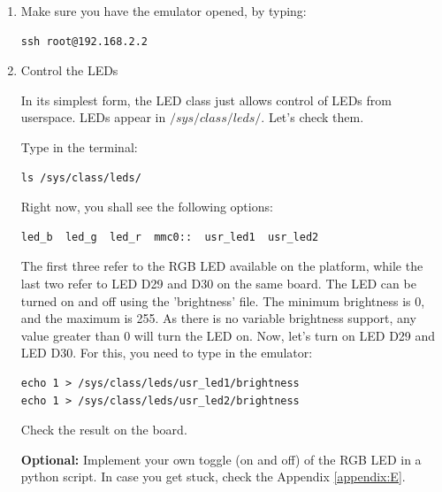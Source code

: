 \begin{enumerate}
\item Make sure you have the emulator opened, by typing:

   \begin{tcolorbox}
        \begin{verbatim}
ssh root@192.168.2.2
        \end{verbatim}
    \end{tcolorbox}


\item Control the LEDs

In its simplest form, the LED class just allows control of LEDs from userspace. LEDs appear in $/sys/class/leds/$. Let's check them.

Type in the terminal:
   \begin{tcolorbox}
        \begin{verbatim}
ls /sys/class/leds/
        \end{verbatim}
    \end{tcolorbox}

Right now, you shall see the following options:

   \begin{tcolorbox}
        \begin{verbatim}
led_b  led_g  led_r  mmc0::  usr_led1  usr_led2
        \end{verbatim}
    \end{tcolorbox}

The first three refer to the RGB LED available on the platform, while the last two refer to LED D29 and D30 on the same board. The LED can be turned on and off using the 'brightness' file. The minimum brightness is 0, and the maximum is 255. As there is no variable brightness support, any value greater than 0 will turn the LED on. Now, let's turn on LED D29 and LED D30. For this, you need to type in the emulator:

   \begin{tcolorbox}
        \begin{verbatim}
echo 1 > /sys/class/leds/usr_led1/brightness
echo 1 > /sys/class/leds/usr_led2/brightness
        \end{verbatim}
    \end{tcolorbox}

Check the result on the board.

{\textbf{\color{red}Optional:}} Implement your own toggle (on and off) of the RGB LED in a python script. In case you get stuck, check the Appendix \cref{appendix:E}.




\end{enumerate}
